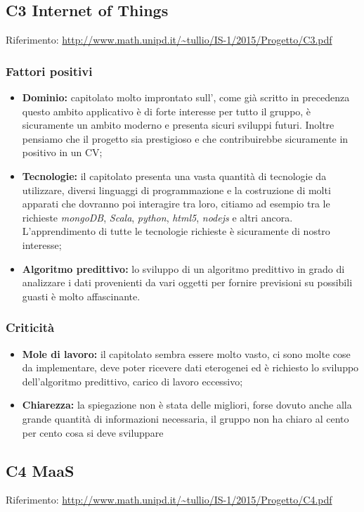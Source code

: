 \documentclass{scalatekids-article}
\begin{document}
\subsection{C3 Internet of Things}
Riferimento: \url{http://www.math.unipd.it/~tullio/IS-1/2015/Progetto/C3.pdf}\\
\subsubsection{Fattori positivi}
\begin{itemize}
  \item \textbf{Dominio:} capitolato molto improntato sull', come già scritto in precedenza questo ambito applicativo è di forte interesse per tutto il gruppo, è sicuramente un ambito moderno e presenta sicuri sviluppi futuri. Inoltre pensiamo che il progetto sia prestigioso e che contribuirebbe sicuramente in positivo in un CV;
  \item \textbf{Tecnologie:} il capitolato presenta una vasta quantità di tecnologie da utilizzare, diversi linguaggi di programmazione e la costruzione di molti apparati che dovranno poi interagire tra loro, citiamo ad esempio tra le richieste \textit{mongoDB}, \textit{Scala}, \textit{python}, \textit{html5}, \textit{nodejs} e altri ancora. L'apprendimento di tutte le tecnologie richieste è sicuramente di nostro interesse;
  \item \textbf{Algoritmo predittivo:} lo sviluppo di un algoritmo predittivo in grado di analizzare i dati provenienti da vari oggetti per fornire previsioni su possibili guasti è molto affascinante.
\end{itemize}
\subsubsection{Criticità}
\begin{itemize}
  \item \textbf{Mole di lavoro:} il capitolato sembra essere molto vasto, ci sono molte cose da implementare, deve poter ricevere dati eterogenei ed è richiesto lo sviluppo dell'algoritmo predittivo, carico di lavoro eccessivo;
  \item \textbf{Chiarezza:} la spiegazione non è stata delle migliori, forse dovuto anche alla grande quantità di informazioni necessaria, il gruppo non ha chiaro al cento per cento cosa si deve sviluppare
\end{itemize}

\subsection{C4 MaaS}
Riferimento: \url{http://www.math.unipd.it/~tullio/IS-1/2015/Progetto/C4.pdf}\\
\end{document}

